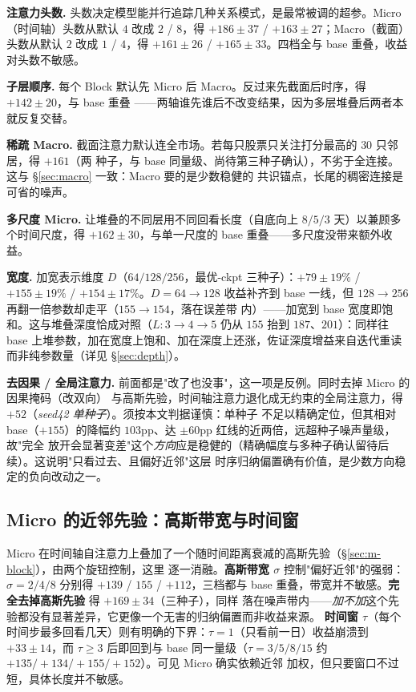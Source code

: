 \documentclass[a4paper,11pt,fontset=fandol]{ctexart}
\begin{document}
\textbf{\heiti 注意力头数.} 头数决定模型能并行追踪几种关系模式，是最常被调的超参。Micro（时间轴）头数从默认
$4$ 改成 $2$ / $8$，得 $+186\pm37$ / $+163\pm27$；Macro（截面）头数从默认 $2$ 改成 $1$ / $4$，得 $+161\pm26$ /
$+165\pm33$。四档全与 base 重叠，收益对头数不敏感。

\textbf{\heiti 子层顺序.} 每个 Block 默认先 Micro 后 Macro。反过来先截面后时序，得 $+142\pm20$，与 base 重叠
——两轴谁先谁后不改变结果，因为多层堆叠后两者本就反复交替。

\textbf{\heiti 稀疏 Macro.} 截面注意力默认连全市场。若每只股票只关注打分最高的 $30$ 只邻居，得 $+161$（两
种子，与 base 同量级、尚待第三种子确认），不劣于全连接。这与 §\ref{sec:macro} 一致：Macro 要的是少数稳健的
共识锚点，长尾的稠密连接是可省的噪声。

\textbf{\heiti 多尺度 Micro.} 让堆叠的不同层用不同回看长度（自底向上 $8/5/3$ 天）以兼顾多个时间尺度，得
$+162\pm30$，与单一尺度的 base 重叠——多尺度没带来额外收益。

\textbf{\heiti 宽度.} 加宽表示维度 $D$（$64/128/256$，最优-ckpt 三种子）：$+79\pm19\%$ / $+155\pm19\%$ /
$+154\pm17\%$。$D{=}64\to128$ 收益补齐到 base 一线，但 $128\to256$ 再翻一倍参数却走平（$155\to154$，落在误差带
内）——加宽到 base 宽度即饱和。这与堆叠深度恰成对照（$L{:}3\to4\to5$ 仍从 $155$ 抬到 $187$、$201$）：同样往
base 上堆参数，加在宽度上饱和、加在深度上还涨，佐证深度增益来自迭代重读而非纯参数量（详见 §\ref{sec:depth}）。

\textbf{\heiti 去因果 / 全局注意力.} 前面都是"改了也没事"，这一项是反例。同时去掉 Micro 的因果掩码（改双向）
与高斯先验，时间轴注意力退化成无约束的全局注意力，得 $+52$（\emph{seed42 单种子}）。须按本文判据谨慎：单种子
不足以精确定位，但其相对 base（$+155$）的降幅约 $103$pp、达 $\pm60$pp 红线的近两倍，远超种子噪声量级，故"完全
放开会显著变差"这个\emph{方向}应是稳健的（精确幅度与多种子确认留待后续）。这说明"只看过去、且偏好近邻"这层
时序归纳偏置确有价值，是少数方向稳定的负向改动之一。

\subsection{Micro 的近邻先验：高斯带宽与时间窗}\label{sec:abl-micro}
Micro 在时间轴自注意力上叠加了一个随时间距离衰减的高斯先验（§\ref{sec:m-block}），由两个旋钮控制，这里
逐一消融。\textbf{\heiti 高斯带宽 $\sigma$} 控制"偏好近邻"的强弱：$\sigma{=}2/4/8$ 分别得 $+139$ / $155$ /
$+112$，三档都与 base 重叠，带宽并不敏感。\textbf{\heiti 完全去掉高斯先验} 得 $+169\pm34$（三种子），同样
落在噪声带内——\emph{加不加}这个先验都没有显著差异，它更像一个无害的归纳偏置而非收益来源。\textbf{\heiti
时间窗 $\tau$}（每个时间步最多回看几天）则有明确的下界：$\tau{=}1$（只看前一日）收益崩溃到 $+33\pm14$，而
$\tau\ge3$ 后即回到与 base 同一量级（$\tau{=}3/5/8/15$ 约 $+135/+134/+155/+152$）。可见 Micro 确实依赖近邻
加权，但只要窗口不过短，具体长度并不敏感。
\end{document}
